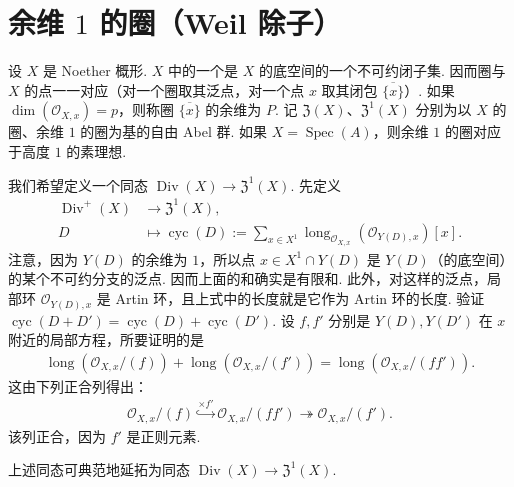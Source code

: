 \section{余维 \texorpdfstring{$1$}{1} 的圈（Weil 除子）}\label{sec:ag-1-3}
\begin{numpara}[圈]\label{item:ag-1-3-1}
设 $X$ 是 Noether 概形. $X$ 中的一个是 $X$ 的底空间的一个不可约闭子集. 因而圈与 $X$ 的点一一对应（对一个圈取其泛点，对一个点 $x$ 取其闭包 $\overline{\{x\}}$）. 如果 $\dim(\mathcal O_{X,x})=p$，则称圈 $\overline{\{x\}}$ 的余维为 $P$.
记 $\mathfrak Z(X)$、$\mathfrak Z^1(X)$ 分别为以 $X$ 的圈、余维 $1$ 的圈为基的自由 Abel 群.
如果 $X=\operatorname{Spec}(A)$，则余维 $1$ 的圈对应于高度 $1$ 的素理想.
\end{numpara}
\begin{numpara}\label{item:ag-1-3-2}
我们希望定义一个同态 $\operatorname{Div}(X)\longrightarrow\mathfrak Z^1(X)$. 先定义
\begin{align*}
\operatorname{Div}^+(X)&\longrightarrow\mathfrak Z^1(X),\\
D&\longmapsto\operatorname{cyc}(D):=
\sum_{x\in X^1}\operatorname{long}_{\mathcal O_{X,x}}(\mathcal O_{Y(D),x})[x].
\end{align*}
注意，因为 $Y(D)$ 的余维为 $1$，所以点 $x\in X^1\cap Y(D)$ 是 $Y(D)$（的底空间）的某个不可约分支的泛点. 因而上面的和确实是有限和. 此外，对这样的泛点，局部环 $\mathcal O_{Y(D),x}$ 是 Artin 环，且上式中的长度就是它作为 Artin 环的长度.
验证 $\operatorname{cyc}(D+D')=\operatorname{cyc}(D)+\operatorname{cyc}(D')$. 设 $f,f'$ 分别是 $Y(D),Y(D')$ 在 $x$ 附近的局部方程，所要证明的是
\begin{align*}
\operatorname{long}(\mathcal O_{X,x}/(f))+
\operatorname{long}(\mathcal O_{X,x}/(f'))
=\operatorname{long}(\mathcal O_{X,x}/(ff')).
\end{align*}
这由下列正合列得出：
\begin{align*}
\mathcal O_{X,x}/(f)\overset{\times f'}{\hookrightarrow}
\mathcal O_{X,x}/(ff')\twoheadrightarrow\mathcal O_{X,x}/(f').
\end{align*}
该列正合，因为 $f'$ 是正则元素.
\end{numpara}
\begin{proposition}\label{item:ag-1-3-3}
上述同态可典范地延拓为同态 $\operatorname{Div}(X)\longrightarrow\mathfrak Z^1(X)$.
\end{proposition}
